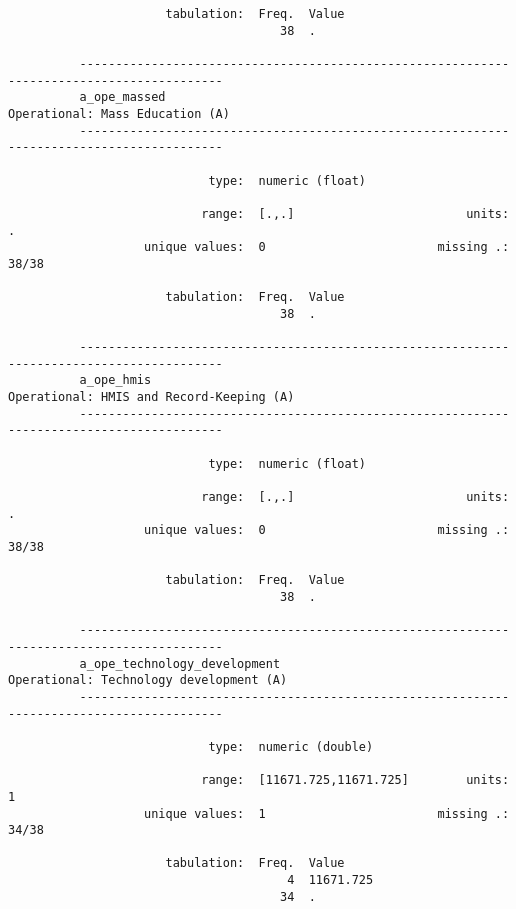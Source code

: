 \documentclass{article}
\begin{document}
\begin{verbatim}
                      tabulation:  Freq.  Value
                                      38  .
          
          ------------------------------------------------------------------------------------------
          a_ope_massed                                               Operational: Mass Education (A)
          ------------------------------------------------------------------------------------------
          
                            type:  numeric (float)
          
                           range:  [.,.]                        units:  .
                   unique values:  0                        missing .:  38/38
          
                      tabulation:  Freq.  Value
                                      38  .
          
          ------------------------------------------------------------------------------------------
          a_ope_hmis                                        Operational: HMIS and Record-Keeping (A)
          ------------------------------------------------------------------------------------------
          
                            type:  numeric (float)
          
                           range:  [.,.]                        units:  .
                   unique values:  0                        missing .:  38/38
          
                      tabulation:  Freq.  Value
                                      38  .
          
          ------------------------------------------------------------------------------------------
          a_ope_technology_development                       Operational: Technology development (A)
          ------------------------------------------------------------------------------------------
          
                            type:  numeric (double)
          
                           range:  [11671.725,11671.725]        units:  1
                   unique values:  1                        missing .:  34/38
          
                      tabulation:  Freq.  Value
                                       4  11671.725
                                      34  .
          

\end{verbatim}
\end{document}

